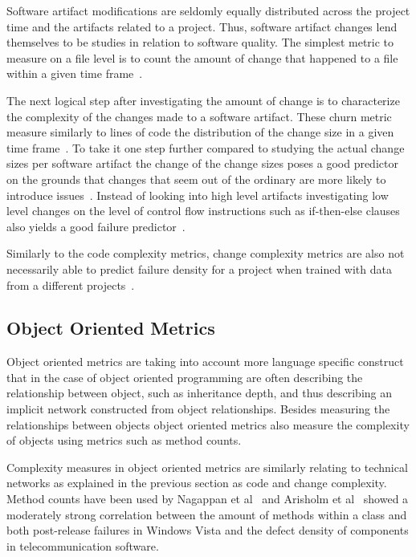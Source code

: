 Software artifact modifications are seldomly equally distributed across the project time and the artifacts related to a project.
Thus, software artifact changes lend themselves to be studies in relation to software quality.
The simplest metric to measure on a file level is to count the amount of change that happened to a file within a given time frame~\cite{li:metrics:2005,moser:icse:2008,cataldo:icse:2011}.

The next logical step after investigating the amount of change is to characterize the complexity of the changes made to a software artifact. 
These churn metric measure similarly to lines of code the distribution of the change size in a given time frame~\cite{nagappan:icse:2005,shihab:fse:2011,zimmermann:fse:2009,bell:promise:2011}.
To take it one step further compared to studying the actual change sizes per software artifact the change of the change sizes poses a good predictor on the grounds that changes that seem out of the ordinary are more likely to introduce issues~\cite{hassan:icse:2009}.
Instead of looking into high level artifacts investigating low level changes on the level of control flow instructions such as if-then-else clauses also yields a good failure predictor~\cite{giger:msr:2011}.

Similarly to the code complexity metrics, change complexity metrics are also not necessarily able to predict failure density for a project when trained with data from a different projects~\cite{zimmermann:fse:2009}.


\subsection{Object Oriented Metrics}
\label{chap:6:sub:oom}
Object oriented metrics are taking into account more language specific construct that in the case of object oriented programming are often describing the relationship between object, such as inheritance depth, and thus describing an implicit network constructed from object relationships.
Besides measuring the relationships between objects object oriented metrics also measure the complexity of objects using metrics such as method counts.

Complexity measures in object oriented metrics are similarly relating to technical networks as explained in the previous section as code and change complexity.
Method counts have been used by Nagappan et al~\cite{nagappan:icse:2006} and Arisholm et al~\cite{arisholm:isese:2006} showed a moderately strong correlation between the amount of methods within a class and both post-release failures in Windows Vista and the defect density of components in telecommunication software.

